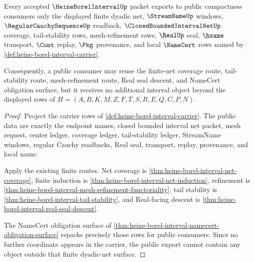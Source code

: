 \begin{theorem}
\label{thm:heine-borel-interval-public-finite-net-export}
\label{thm:heineborelinterval-public-finite-net-export}
Every accepted $\HeineBorelIntervalUp$ packet exports to public compactness consumers only the displayed finite dyadic net, $\StreamNameUp$ windows, $\RegularCauchySequenceUp$ readback, $\ClosedBoundedIntervalNetUp$ coverage, tail-stability rows, mesh-refinement rows, $\RealUp$ seal, $\hsame$ transport, $\Cont$ replay, $\Pkg$ provenance, and local $\NameCert$ rows named by \autoref{def:heine-borel-interval-carrier}.

Consequently, a public consumer may reuse the finite-net coverage route, tail-stability route, mesh-refinement route, Real seal descent, and NameCert obligation surface, but it receives no additional interval object beyond the displayed rows of $H=(A,B,K,M,Z,F,T,S,R,E,Q,C,P,N)$.
\end{theorem}
\begin{proof}
Project the carrier rows of \autoref{def:heine-borel-interval-carrier}. The public data are exactly the endpoint names, closed bounded interval net packet, mesh request, center ledger, coverage ledger, tail-stability ledger, StreamName windows, regular Cauchy readbacks, Real seal, transport, replay, provenance, and local name.

Apply the existing finite routes. Net coverage is \autoref{thm:heine-borel-interval-net-coverage}, finite induction is \autoref{thm:heine-borel-interval-net-induction}, refinement is \autoref{thm:heine-borel-interval-mesh-refinement-functoriality}, tail stability is \autoref{thm:heine-borel-interval-tail-stability}, and Real-facing descent is \autoref{thm:heine-borel-interval-real-seal-descent}.

The NameCert obligation surface of \autoref{thm:heine-borel-interval-namecert-obligation-surface} repacks precisely those rows for public consumers. Since no further coordinate appears in the carrier, the public export cannot contain any object outside that finite dyadic-net surface.
\end{proof}

